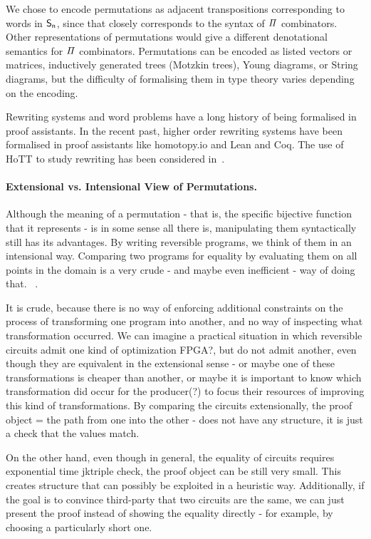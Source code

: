 We chose to encode permutations as adjacent transpositions corresponding to words in $\Sn$, since that closely
corresponds to the syntax of $\mathit{\Pi}$ combinators. Other representations of permutations would give a different
denotational semantics for $\mathit{\Pi}$ combinators. Permutations can be encoded as listed vectors or matrices, inductively
generated trees (Motzkin trees), Young diagrams, or String diagrams, but the difficulty of formalising them in type
theory varies depending on the encoding.

Rewriting systems and word problems have a long history of being formalised in proof assistants. In the recent past,
higher order rewriting systems have been formalised in proof assistants like {homotopy.io} and Lean and Coq. The use of
HoTT to study rewriting has been considered in~\cite{krausCoherenceWellFoundednessTaming2020}.

\paragraph{Extensional vs. Intensional View of Permutations.}
Although the meaning of a permutation - that is, the specific bijective function
that it represents - is in some sense all there is, manipulating them
syntactically still has its advantages. By writing reversible programs, we think
of them in an intensional way. Comparing two programs for equality by evaluating
them on all points in the domain is a very crude - and maybe even inefficient -
way of doing that. ~\cite{Kuehlmann:2006:RBR:2298470.2300327,10.1007/978-3-540-24605-3_4,Yamashita:2010:FEQ:1835957.1835965}.

It is crude, because there is no way of enforcing additional constraints on the
process of transforming one program into another, and no way of inspecting what
transformation occurred. We can imagine a practical situation in which reversible
circuits admit one kind of optimization FPGA?, but do not admit another,
even though they are equivalent in the extensional sense - or maybe one of these
transformations is cheaper than another, or maybe it is important to know which
transformation did occur for the producer(?) to focus their resources of
improving this kind of transformations. By comparing the circuits extensionally,
the proof object = the path from one into the other - does not have any
structure,  it is just a check that the values match.

On the other hand, even though in general, the equality of circuits requires
exponential time jk{triple check}, the proof object can be still very small.
This creates structure that can possibly be exploited in a heuristic way.
Additionally, if the goal is to convince third-party that two circuits are
the same, we can just present the proof instead of showing the equality directly
- for example, by choosing a particularly short one.

